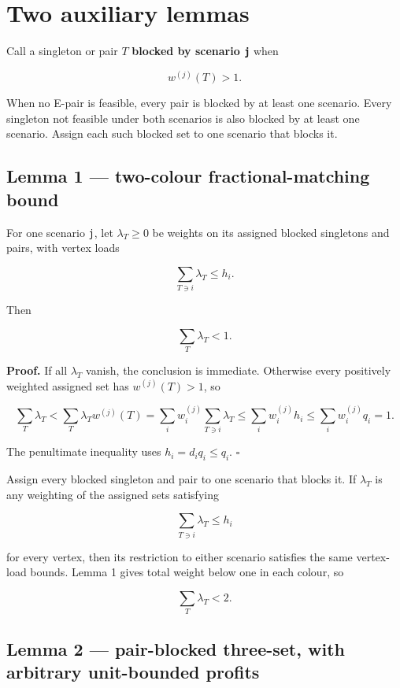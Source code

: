 \documentclass[
  11pt,
]{article}
\begin{document}
\section{Two auxiliary lemmas}\label{two-auxiliary-lemmas}

Call a singleton or pair \(T\) \textbf{blocked by scenario \texttt{j}}
when

\[
w^{(j)}(T)>1.
\]

When no E-pair is feasible, every pair is blocked by at least one
scenario. Every singleton not feasible under both scenarios is also
blocked by at least one scenario. Assign each such blocked set to one
scenario that blocks it.

\subsection{Lemma 1 --- two-colour fractional-matching
bound}\label{lemma-1-two-colour-fractional-matching-bound}

For one scenario \texttt{j}, let \(\lambda_T\ge0\) be weights on its
assigned blocked singletons and pairs, with vertex loads

\[
\sum_{T\ni i}\lambda_T\le h_i.
\]

Then

\[
\sum_T\lambda_T<1.
\]

\textbf{Proof.} If all \(\lambda_T\) vanish, the conclusion is
immediate. Otherwise every positively weighted assigned set has
\(w^{(j)}(T)>1\), so

\[
\sum_T\lambda_T
<
\sum_T\lambda_Tw^{(j)}(T)
=
\sum_iw_i^{(j)}\sum_{T\ni i}\lambda_T
\le
\sum_iw_i^{(j)}h_i
\le
\sum_iw_i^{(j)}q_i
=1.
\]

The penultimate inequality uses \(h_i=d_iq_i\le q_i\). \(\square\)

Assign every blocked singleton and pair to one scenario that blocks it.
If \(\lambda_T\) is any weighting of the assigned sets satisfying

\[
\sum_{T\ni i}\lambda_T\le h_i
\]

for every vertex, then its restriction to either scenario satisfies the
same vertex-load bounds. Lemma 1 gives total weight below one in each
colour, so

\[
\sum_T\lambda_T<2.
\]

\subsection{Lemma 2 --- pair-blocked three-set, with arbitrary
unit-bounded
profits}\label{lemma-2-pair-blocked-three-set-with-arbitrary-unit-bounded-profits}
\end{document}
